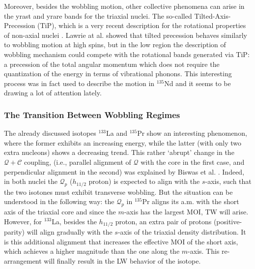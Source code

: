 Moreover, besides the wobbling motion, other collective phenomena can arise in the yrast and yrare bands for the triaxial nuclei. The so-called Tilted-Axis-Precession (TiP), which is a very recent description for the rotational properties of non-axial nuclei \cite{lawrie2020tilted}. Lawrie at al. showed that tilted precession behaves similarly to wobbling motion at high spins, but in the low region the description of wobbling mechanism could compete with the rotational bands generated via TiP: a precession of the total angular momentum which does not require the quantization of the energy in terms of vibrational phonons. This interesting process was in fact used to describe the motion in $^{135}$Nd \cite{lv2021tilted} and it seems to be drawing a lot of attention lately.

\subsubsection*{The Transition Between Wobbling Regimes}

The already discussed isotopes $^{133}$La and $^{135}$Pr show an interesting phenomenon, where the former exhibits an increasing energy, while the latter (with only two extra nucleons) shows a decreasing trend. This rather `abrupt' change in the $\mathcal{Q}+\mathscr{C}$ coupling, (i.e., parallel alignment of $\mathcal{Q}$ with the core in the first case, and perpendicular alignment in the second) was explained by Biswas et al. \cite{biswas2019longitudinal}. Indeed, in both nuclei the $\mathcal{Q}_p$ ($h_{11/2}$ proton) is expected to align with the $s$-axis, such that the two isotones must exhibit transverse wobbling. But the situation can be understood in the following way: the $\mathcal{Q}_p$ in $^{135}$Pr aligns its a.m. with the short axis of the triaxial core and since the $m$-axis has the largest MOI, TW will arise. However, for $^{133}$La, besides the $h_{11/2}$ proton, an extra pair of protons (positive-parity) will align gradually with the $s$-axis of the triaxial density distribution. It is this additional alignment that increases the effective MOI of the short axis, which achieves a higher magnitude than the one along the $m$-axis. This re-arrangement will finally result in the LW behavior of the isotope.

